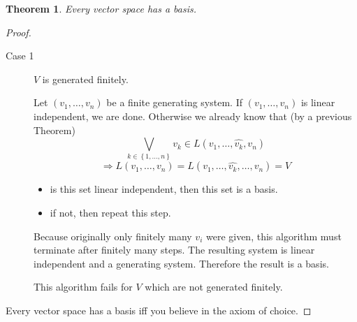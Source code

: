 \documentclass[a4paper,landscape,twocolumn]{article}
\newcommand\set[1]{\left\{#1\right\}}
\newtheorem{theorem}{Theorem}
\begin{document}
\begin{theorem}
  Every vector space has a basis.
\end{theorem}
\begin{proof}
  \begin{description}
    \item[Case 1]
      $V$ is generated finitely.

      Let $(v_1, \ldots, v_n)$ be a finite generating system. If $(v_1, \ldots, v_n)$ is linear independent, we are done.
      Otherwise we already know that (by a previous Theorem)
      \[ \bigvee_{k \in \set{1, \ldots, n}} v_k \in L(v_1, \ldots, \hat{v_k},  v_n) \]
      \[ \Rightarrow L(v_1, \ldots, v_n) = L(v_1, \ldots, \hat{v_k}, \ldots, v_n) = V \]
      \begin{itemize}
        \item is this set linear independent, then this set is a basis.
        \item if not, then repeat this step.
      \end{itemize}

      Because originally only finitely many $v_i$ were given, this algorithm must terminate after finitely many steps.
      The resulting system is linear independent and a generating system.
      Therefore the result is a basis.

      This algorithm fails for $V$ which are not generated finitely.
  \end{description}

  Every vector space has a basis iff you believe in the axiom of choice.
\end{proof}
\end{document}
